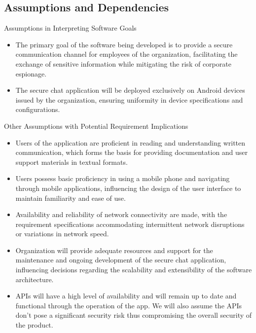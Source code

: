 \documentclass[]{article}
\begin{document}
\subsection{Assumptions and Dependencies}
\label{sub:assumptions_and_dependencies}
Assumptions in Interpreting Software Goals
\begin{itemize}
	\item The primary goal of the software being developed is to provide a secure communication channel for employees of the organization, facilitating the exchange of sensitive information while mitigating the risk of corporate espionage.
	\item The secure chat application will be deployed exclusively on Android devices issued by the organization, ensuring uniformity in device specifications and configurations.
\end{itemize}
Other Assumptions with Potential Requirement Implications
\begin{itemize}
	\item Users of the application are proficient in reading and understanding written communication, which forms the basis for providing documentation and user support materials in textual formats.
	\item Users possess basic proficiency in using a mobile phone and navigating through mobile applications, influencing the design of the user interface to maintain familiarity and ease of use.
	\item Availability and reliability of network connectivity are made, with the requirement specifications accommodating intermittent network disruptions or variations in network speed.
	\item Organization will provide adequate resources and support for the maintenance and ongoing development of the secure chat application, influencing decisions regarding the scalability and extensibility of the software architecture.
	\item APIs will have a high level of availability and will remain up to date and functional through the operation of the app. We will also assume the APIs don't pose a significant security risk thus compromising the overall security of the product.
\end{itemize}
\end{document}
